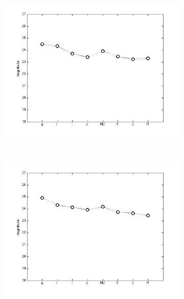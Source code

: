 \documentclass[useAMS,usenatbib,fleqn]{mn2e}
\begin{document}
\begin{figure}
        \centering
        
        \begin{subfigure}[b]{0.075\textwidth}
                \includegraphics[trim = 35px 15px 50px 25px, clip=true,width=\textwidth]{basis_01.jpg}
        \end{subfigure}
	~
        \begin{subfigure}[b]{0.075\textwidth}
                \includegraphics[trim = 35px 15px 50px 25px, clip=true,width=\textwidth]{basis_02.jpg}
        \end{subfigure}
        ~
        \begin{subfigure}[b]{0.075\textwidth}

\end{subfigure}
\end{figure}
\end{document}
